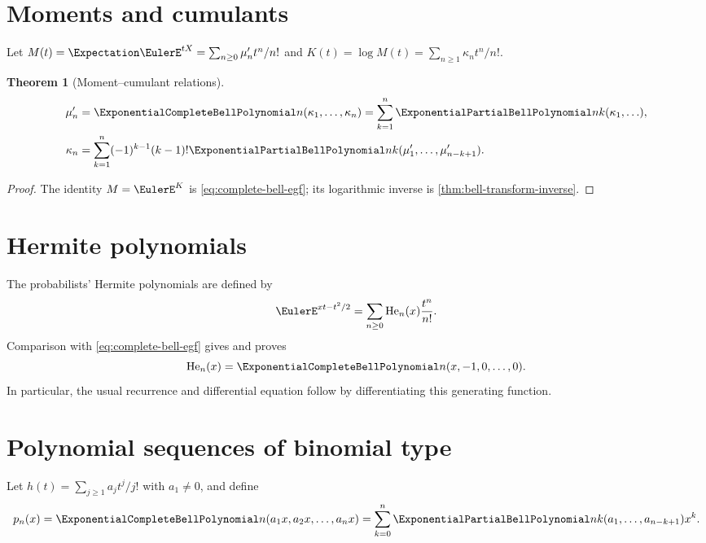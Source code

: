 \documentclass[11pt,a4paper,oneside,openany]{book}
\newtheorem{theorem}{Theorem}[chapter]
\theoremstyle{definition}
\theoremstyle{remark}
\begin{document}
\section{Moments and cumulants}
Let $M(t)=\Expectation \EulerE^{tX}=\sum_{n\ge0}\mu'_nt^n/n!$ and
$K(t)=\log M(t)=\sum_{n\ge1}\kappa_nt^n/n!$.
\begin{theorem}[Moment--cumulant relations]\label{thm:moment-cumulant}
\begin{align}
 \mu'_n&=\ExponentialCompleteBellPolynomial n(\kappa_1,\ldots,\kappa_n)
 =\sum_{k=1}^{n}\ExponentialPartialBellPolynomial nk(\kappa_1,\ldots),
 \label{eq:moments-from-cumulants}\\
 \kappa_n&=\sum_{k=1}^{n}(-1)^{k-1}(k-1)!
 \ExponentialPartialBellPolynomial nk(\mu'_1,\ldots,\mu'_{n-k+1}).
 \label{eq:cumulants-from-moments}
\end{align}
\end{theorem}
\begin{proof}
The identity $M=\EulerE^K$ is \eqref{eq:complete-bell-egf}; its logarithmic inverse is
\cref{thm:bell-transform-inverse}.
\end{proof}

\section{Hermite polynomials}
The probabilists' Hermite polynomials are defined by
\[
 \EulerE^{xt-t^2/2}=\sum_{n\ge0}\operatorname{He}_n(x)\frac{t^n}{n!}.
\]
Comparison with \eqref{eq:complete-bell-egf} gives and proves
\begin{equation}\label{eq:hermite-bell}
 \operatorname{He}_n(x)=\ExponentialCompleteBellPolynomial n(x,-1,0,\ldots,0).
\end{equation}
In particular, the usual recurrence and differential equation follow by
differentiating this generating function.

\section{Polynomial sequences of binomial type}
Let
$h(t)=\sum_{j\ge1}a_jt^j/j!$ with $a_1\ne0$, and define
\begin{equation}\label{eq:binomial-type-bell}
 p_n(x)=\ExponentialCompleteBellPolynomial n(a_1x,a_2x,\ldots,a_nx)
 =\sum_{k=0}^{n}\ExponentialPartialBellPolynomial nk(a_1,\ldots,a_{n-k+1})x^k.
\end{equation}
\end{document}
